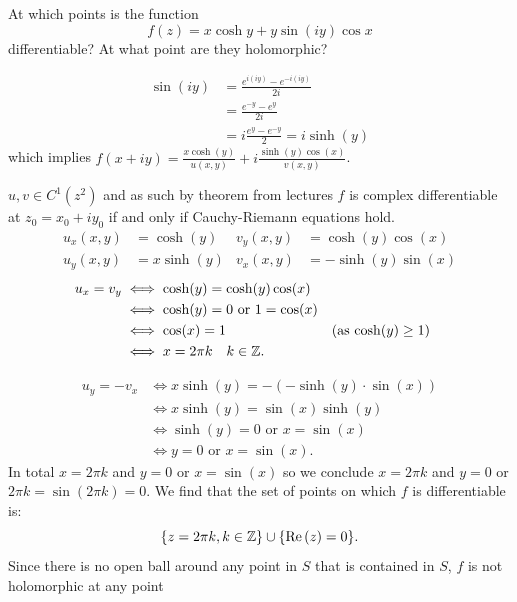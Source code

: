 \documentclass[10pt, a4paper]{article}
\begin{document}
\begin{problem}
    At which points is the function
    \[
    f(z) = x\cosh{y} + y\sin(iy)\cos{x}
    \]
    differentiable?
    At what point are they holomorphic?

    \begin{solution}
        \begin{align*}
            \sin(iy) &= \frac{e ^ {i(iy)} - e ^ {-i(iy)}}{2i} \\
            &= \frac{e ^ {-y} - e ^ {y}}{2i} \\
            &= i\frac{e ^ y - e ^ {-y}}{2} = i\sinh(y)
        \end{align*}
        which implies $f(x + iy) = \frac{x\cosh(y)}{u(x, y)} + i\frac{\sinh(y)\cos(x)}{v(x, y)}$.

        $u, v \in C ^ 1(z ^ 2)$ and as such by theorem from lectures $f$ is complex differentiable at $z_0 = x_0 + iy_0$ if and only if Cauchy-Riemann equations hold.
        \begin{align*}
            u_x(x, y) &= \cosh(y) & v_y(x, y) &= \cosh(y)\cos(x) \\
            u_y(x, y) &= x\sinh(y) & v_x(x, y) &= -\sinh(y)\sin(x)
        \end{align*}
        \begin{align*}
            u_x = v_y &\iff \cosh(y) = \cosh(y)\cos(x) \\
            &\iff \cosh(y) = 0\text{ or } 1 = \cos(x) \\
            &\iff \cos(x) = 1 &&(\text{as $\cosh(y) \geq 1$}) \\
            &\iff x = 2\pi k\quad k \in \mathbb{Z}.
        \end{align*}

        \begin{align*}
            u_y = -v_x &\iff x\sinh(y) = -(-\sinh(y)\cdot \sin(x)) \\
            &\iff x\sinh(y) = \sin(x)\sinh(y) \\
            &\iff \sinh(y) = 0\text{ or } x = \sin(x) \\
            &\iff y = 0\text{ or } x = \sin(x).
        \end{align*}
        In total $x = 2\pi k$ and $y = 0$ or $x = \sin(x)$ so we conclude $x = 2\pi k$ and $y = 0$ or $2\pi k = \sin(2\pi k) = 0$.
        We find that the set of points on which $f$ is differentiable is:
        \[
        \{z = 2\pi k, k \in \mathbb{Z}\} \cup \{\mathrm{Re}\,(z) = 0\}.
        \]
        Since there is no open ball around any point in $S$ that is contained in $S$,
        $f$ is not holomorphic at any point
    \end{solution}
\end{problem}
\end{document}
